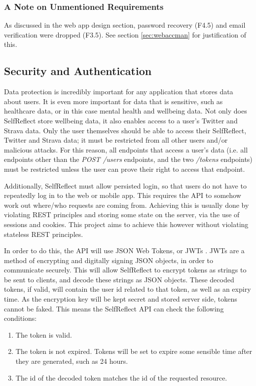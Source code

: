 \documentclass[11pt,openright,a4paper]{report}
\begin{document}
\subsubsection{A Note on Unmentioned Requirements}
As discussed in the web app design section, password recovery (F4.5) and email verification were dropped (F3.5). See section \ref{sec:webaccman} for justification of this.

\subsection{Security and Authentication} \label{sec:apisecurity}
Data protection is incredibly important for any application that stores data about users. It is even more important for data that is sensitive, such as healthcare data, or in this case mental health and wellbeing data. Not only does SelfReflect store wellbeing data, it also enables access to a user's Twitter and Strava data. Only the user themselves should be able to access their SelfReflect, Twitter and Strava data; it must be restricted from all other users and/or malicious attacks. For this reason, all endpoints that access a user's data (i.e. all endpoints other than the \emph{POST /users} endpoints, and the two \emph{/tokens} endpoints) must be restricted unless the user can prove their right to access that endpoint.

Additionally, SelfReflect must allow persisted login, so that users do not have to repeatedly log in to the web or mobile app. This requires the API to somehow work out where/who requests are coming from. Achieving this is usually done by violating REST principles and storing some state on the server, via the use of sessions and cookies. This project aims to achieve this however without violating stateless REST principles.

In order to do this, the API will use JSON Web Tokens, or JWTs \parencite{jwtrfc}. JWTs are a method of encrypting and digitally signing JSON objects, in order to communicate securely. This will allow SelfReflect to encrypt tokens as strings to be sent to clients, and decode these strings as JSON objects. These decoded tokens, if valid, will contain the user id related to that token, as well as an expiry time. As the encryption key will be kept secret and stored server side, tokens cannot be faked. This means the SelfReflect API can check the following conditions:
\begin{enumerate}
\item The token is valid.
\item The token is not expired. Tokens will be set to expire some sensible time after they are generated, such as 24 hours.
\item The id of the decoded token matches the id of the requested resource.
\end{enumerate}
\end{document}
